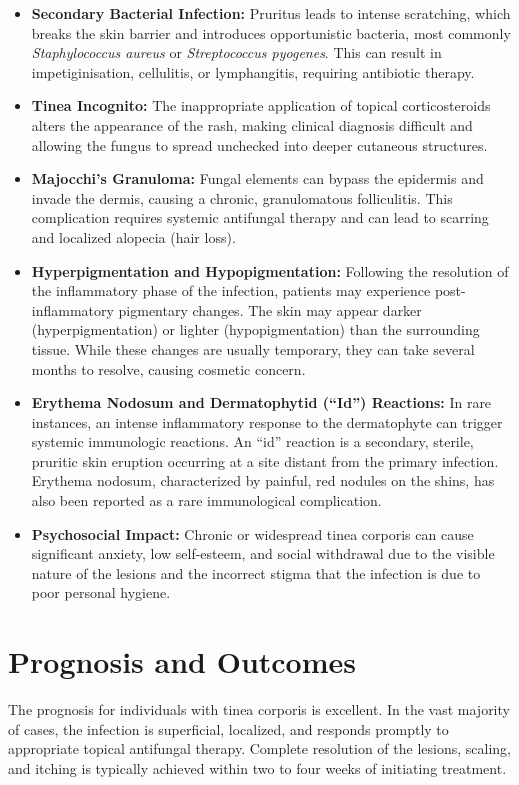 \begin{itemize}
    \item \textbf{Secondary Bacterial Infection:} Pruritus leads to intense scratching, which breaks the skin barrier and introduces opportunistic bacteria, most commonly \textit{Staphylococcus aureus} or \textit{Streptococcus pyogenes}. This can result in impetiginisation, cellulitis, or lymphangitis, requiring antibiotic therapy.
    \item \textbf{Tinea Incognito:} The inappropriate application of topical corticosteroids alters the appearance of the rash, making clinical diagnosis difficult and allowing the fungus to spread unchecked into deeper cutaneous structures.
    \item \textbf{Majocchi's Granuloma:} Fungal elements can bypass the epidermis and invade the dermis, causing a chronic, granulomatous folliculitis. This complication requires systemic antifungal therapy and can lead to scarring and localized alopecia (hair loss).
    \item \textbf{Hyperpigmentation and Hypopigmentation:} Following the resolution of the inflammatory phase of the infection, patients may experience post-inflammatory pigmentary changes. The skin may appear darker (hyperpigmentation) or lighter (hypopigmentation) than the surrounding tissue. While these changes are usually temporary, they can take several months to resolve, causing cosmetic concern.
    \item \textbf{Erythema Nodosum and Dermatophytid (``Id'') Reactions:} In rare instances, an intense inflammatory response to the dermatophyte can trigger systemic immunologic reactions. An ``id'' reaction is a secondary, sterile, pruritic skin eruption occurring at a site distant from the primary infection. Erythema nodosum, characterized by painful, red nodules on the shins, has also been reported as a rare immunological complication.
    \item \textbf{Psychosocial Impact:} Chronic or widespread tinea corporis can cause significant anxiety, low self-esteem, and social withdrawal due to the visible nature of the lesions and the incorrect stigma that the infection is due to poor personal hygiene.
\end{itemize}

\section*{Prognosis and Outcomes}
The prognosis for individuals with tinea corporis is excellent. In the vast majority of cases, the infection is superficial, localized, and responds promptly to appropriate topical antifungal therapy. Complete resolution of the lesions, scaling, and itching is typically achieved within two to four weeks of initiating treatment.

